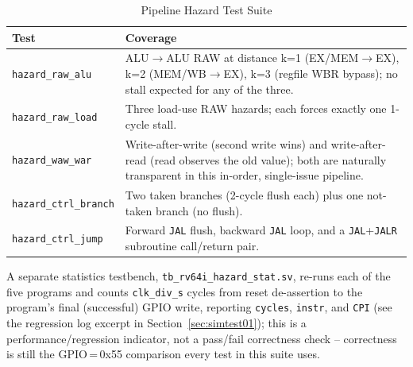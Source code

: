 \begin{table}[H]
\caption{Pipeline Hazard Test Suite}
\label{tab:hazardTests}
\centering
\begin{tabularx}{\textwidth}{|l |X|}
  \hline
  Test & Coverage \\
  \hline
  \hline
  \texttt{hazard\_raw\_alu} & ALU$\to$ALU RAW at distance k=1
    (EX/MEM$\to$EX), k=2 (MEM/WB$\to$EX), k=3 (regfile WBR bypass);
    no stall expected for any of the three. \\
  \hline
  \texttt{hazard\_raw\_load} & Three load-use RAW hazards; each forces
    exactly one 1-cycle stall. \\
  \hline
  \texttt{hazard\_waw\_war} & Write-after-write (second write wins) and
    write-after-read (read observes the old value); both are naturally
    transparent in this in-order, single-issue pipeline. \\
  \hline
  \texttt{hazard\_ctrl\_branch} & Two taken branches (2-cycle flush each)
    plus one not-taken branch (no flush). \\
  \hline
  \texttt{hazard\_ctrl\_jump} & Forward \texttt{JAL} flush, backward
    \texttt{JAL} loop, and a \texttt{JAL}+\texttt{JALR} subroutine
    call/return pair. \\
  \hline
\end{tabularx}
\end{table}

A separate statistics testbench, \texttt{tb\_rv64i\_hazard\_stat.sv},
re-runs each of the five programs and counts \texttt{clk\_div\_s} cycles
from reset de-assertion to the program's final (successful) GPIO write,
reporting \texttt{cycles}, \texttt{instr}, and \texttt{CPI} (see the
regression log excerpt in Section~\ref{sec:simtest01}); this is a
performance/regression indicator, not a pass/fail correctness check --
correctness is still the GPIO\,=\,0x55 comparison every test in this suite
uses.
